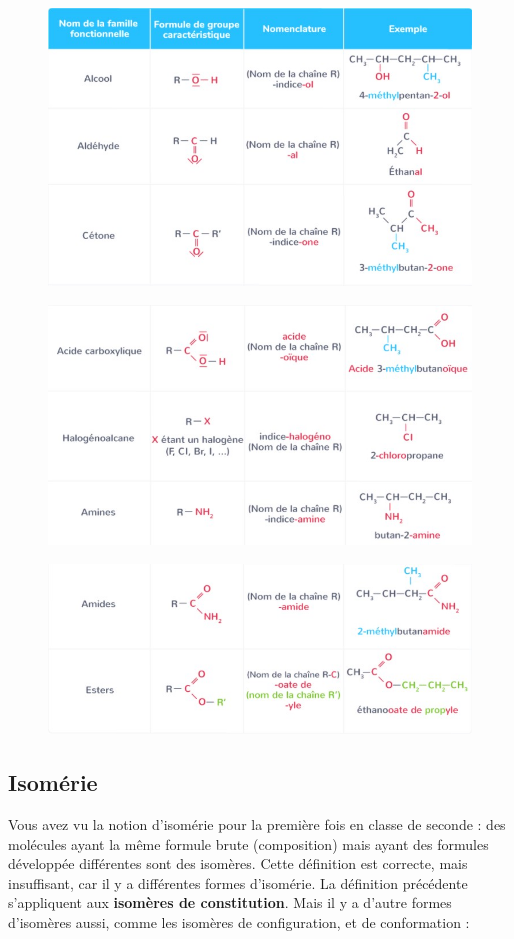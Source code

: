 \documentclass[11pt,a4paper]{article}
\begin{document}
\begin{figure}[H]
    \centering
    \includegraphics[width=0.85\linewidth]{imgs/c5/groupes1.jpg}
\end{figure}
\begin{figure}[H]
    \centering
    \includegraphics[width=0.85\linewidth]{imgs/c5/groupes2.jpg}
\end{figure}
\begin{figure}[H]
    \centering
    \includegraphics[width=0.85\linewidth]{imgs/c5/groupes3.jpg}
\end{figure}


\subsection{Isomérie}
Vous avez vu la notion d'isomérie pour la première fois en classe de seconde : des molécules ayant la même formule brute (composition) mais ayant des formules développée différentes sont des isomères. Cette définition est correcte, mais insuffisant, car il y a différentes formes d'isomérie. La définition précédente s'appliquent aux \textbf{isomères de constitution}. Mais il y a d'autre formes d'isomères aussi, comme les isomères de configuration, et de conformation : 
\end{document}
